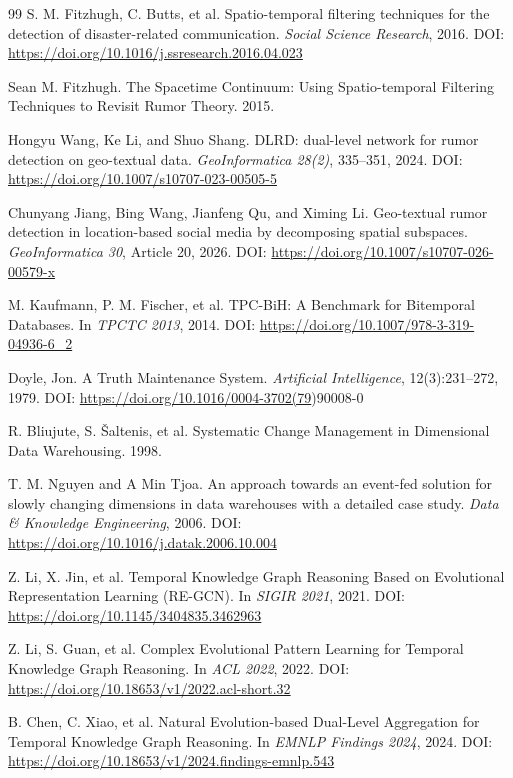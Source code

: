 \begin{thebibliography}{99}
 S. M. Fitzhugh, C. Butts, et al. Spatio-temporal filtering techniques for the detection of disaster-related communication. \emph{Social Science Research}, 2016. DOI: \url{https://doi.org/10.1016/j.ssresearch.2016.04.023}

 Sean M. Fitzhugh. The Spacetime Continuum: Using Spatio-temporal Filtering Techniques to Revisit Rumor Theory. 2015.

 Hongyu Wang, Ke Li, and Shuo Shang. DLRD: dual-level network for rumor detection on geo-textual data. \emph{GeoInformatica 28(2)}, 335–351, 2024. DOI: \url{https://doi.org/10.1007/s10707-023-00505-5}

 Chunyang Jiang, Bing Wang, Jianfeng Qu, and Ximing Li. Geo-textual rumor detection in location-based social media by decomposing spatial subspaces. \emph{GeoInformatica 30}, Article 20, 2026. DOI: \url{https://doi.org/10.1007/s10707-026-00579-x}

 M. Kaufmann, P. M. Fischer, et al. TPC-BiH: A Benchmark for Bitemporal Databases. In \emph{TPCTC 2013}, 2014. DOI: \url{https://doi.org/10.1007/978-3-319-04936-6_2}

 Doyle, Jon. A Truth Maintenance System. \emph{Artificial Intelligence}, 12(3):231–272, 1979. DOI: \url{https://doi.org/10.1016/0004-3702(79})90008-0

 R. Bliujute, S. Šaltenis, et al. Systematic Change Management in Dimensional Data Warehousing. 1998.

 T. M. Nguyen and A Min Tjoa. An approach towards an event-fed solution for slowly changing dimensions in data warehouses with a detailed case study. \emph{Data \& Knowledge Engineering}, 2006. DOI: \url{https://doi.org/10.1016/j.datak.2006.10.004}

 Z. Li, X. Jin, et al. Temporal Knowledge Graph Reasoning Based on Evolutional Representation Learning (RE-GCN). In \emph{SIGIR 2021}, 2021. DOI: \url{https://doi.org/10.1145/3404835.3462963}

 Z. Li, S. Guan, et al. Complex Evolutional Pattern Learning for Temporal Knowledge Graph Reasoning. In \emph{ACL 2022}, 2022. DOI: \url{https://doi.org/10.18653/v1/2022.acl-short.32}

 B. Chen, C. Xiao, et al. Natural Evolution-based Dual-Level Aggregation for Temporal Knowledge Graph Reasoning. In \emph{EMNLP Findings 2024}, 2024. DOI: \url{https://doi.org/10.18653/v1/2024.findings-emnlp.543}


\end{thebibliography}
